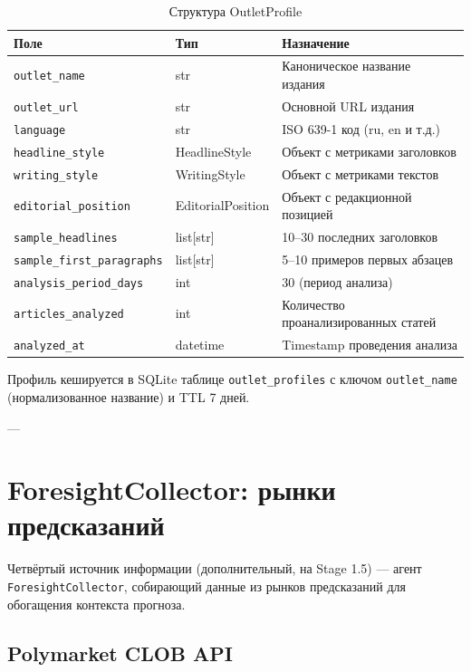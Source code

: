 \begin{table}[h!]
\centering
\caption{Структура OutletProfile}
\label{tab:outlet_profile}
\footnotesize
\begin{tabular}{|l|l|l|}
\hline
\textbf{Поле} & \textbf{Тип} & \textbf{Назначение} \\
\hline
\texttt{outlet\_name} & str & Каноническое название издания \\
\texttt{outlet\_url} & str & Основной URL издания \\
\texttt{language} & str & ISO 639-1 код (ru, en и т.д.) \\
\texttt{headline\_style} & HeadlineStyle & Объект с метриками заголовков \\
\texttt{writing\_style} & WritingStyle & Объект с метриками текстов \\
\texttt{editorial\_position} & EditorialPosition & Объект с редакционной позицией \\
\texttt{sample\_headlines} & list[str] & 10--30 последних заголовков \\
\texttt{sample\_first\_paragraphs} & list[str] & 5--10 примеров первых абзацев \\
\texttt{analysis\_period\_days} & int & 30 (период анализа) \\
\texttt{articles\_analyzed} & int & Количество проанализированных статей \\
\texttt{analyzed\_at} & datetime & Timestamp проведения анализа \\
\hline
\end{tabular}
\end{table}

Профиль кешируется в SQLite таблице \texttt{outlet\_profiles} с ключом \texttt{outlet\_name} (нормализованное название) и TTL 7 дней.

---

\section{ForesightCollector: рынки предсказаний}

Четвёртый источник информации (дополнительный, на Stage 1.5) --- агент \texttt{ForesightCollector}, собирающий данные из рынков предсказаний для обогащения контекста прогноза.


\subsection{Polymarket CLOB API}

